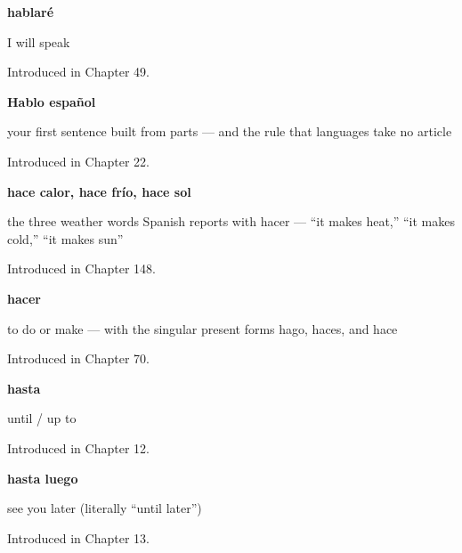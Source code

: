 \noindent\begin{minipage}[t]{\linewidth}
\raggedright
\textbf{hablaré}\par
\small I will speak\par
\footnotesize Introduced in Chapter 49.
\end{minipage}\par\medskip

\noindent\begin{minipage}[t]{\linewidth}
\raggedright
\textbf{Hablo español}\par
\small your first sentence built from parts — and the rule that languages take no article\par
\footnotesize Introduced in Chapter 22.
\end{minipage}\par\medskip

\noindent\begin{minipage}[t]{\linewidth}
\raggedright
\textbf{hace calor, hace frío, hace sol}\par
\small the three weather words Spanish reports with hacer — \textquotedblleft{}it makes heat,\textquotedblright{} \textquotedblleft{}it makes cold,\textquotedblright{} \textquotedblleft{}it makes sun\textquotedblright{}\par
\footnotesize Introduced in Chapter 148.
\end{minipage}\par\medskip

\noindent\begin{minipage}[t]{\linewidth}
\raggedright
\textbf{hacer}\par
\small to do or make — with the singular present forms hago, haces, and hace\par
\footnotesize Introduced in Chapter 70.
\end{minipage}\par\medskip

\noindent\begin{minipage}[t]{\linewidth}
\raggedright
\textbf{hasta}\par
\small until / up to\par
\footnotesize Introduced in Chapter 12.
\end{minipage}\par\medskip

\noindent\begin{minipage}[t]{\linewidth}
\raggedright
\textbf{hasta luego}\par
\small see you later (literally \textquotedblleft{}until later\textquotedblright{})\par
\footnotesize Introduced in Chapter 13.
\end{minipage}\par\medskip

